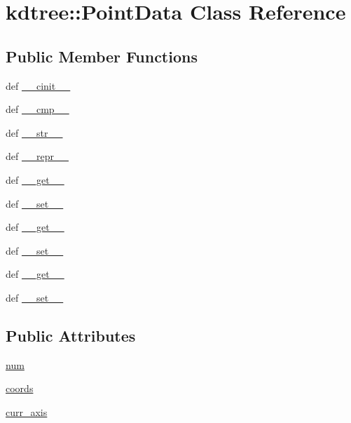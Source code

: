 \hypertarget{classkdtree_1_1PointData}{
\section{kdtree::PointData Class Reference}
\label{classkdtree_1_1PointData}
}
\subsection*{Public Member Functions}
\begin{DoxyCompactItemize}
\item 
def \hyperlink{classkdtree_1_1PointData_a81cadc16da39464cc07f2e8f2e0eb11e}{\_\-\_\-cinit\_\-\_\-}
\item 
def \hyperlink{classkdtree_1_1PointData_a430d24eb45b811759229bd33d0a705e7}{\_\-\_\-cmp\_\-\_\-}
\item 
def \hyperlink{classkdtree_1_1PointData_a1bd852059365e1d18d17d9f81dc6a9b8}{\_\-\_\-str\_\-\_\-}
\item 
def \hyperlink{classkdtree_1_1PointData_a64772819f9e0b27fc161e9072fd58806}{\_\-\_\-repr\_\-\_\-}
\item 
def \hyperlink{classkdtree_1_1PointData_a5000beba86f5112731c5cf9e7243541e}{\_\-\_\-get\_\-\_\-}
\item 
def \hyperlink{classkdtree_1_1PointData_a1f8080905a01c797e4a87153356b8ea6}{\_\-\_\-set\_\-\_\-}
\item 
def \hyperlink{classkdtree_1_1PointData_a5000beba86f5112731c5cf9e7243541e}{\_\-\_\-get\_\-\_\-}
\item 
def \hyperlink{classkdtree_1_1PointData_a1f8080905a01c797e4a87153356b8ea6}{\_\-\_\-set\_\-\_\-}
\item 
def \hyperlink{classkdtree_1_1PointData_a5000beba86f5112731c5cf9e7243541e}{\_\-\_\-get\_\-\_\-}
\item 
def \hyperlink{classkdtree_1_1PointData_a1f8080905a01c797e4a87153356b8ea6}{\_\-\_\-set\_\-\_\-}
\end{DoxyCompactItemize}
\subsection*{Public Attributes}
\begin{DoxyCompactItemize}
\item 
\hyperlink{classkdtree_1_1PointData_aa0f93c69fdf720bec92ee8a758d49014}{num}
\item 
\hyperlink{classkdtree_1_1PointData_ad1370104f57b10805299adb907dda537}{coords}
\item 
\hyperlink{classkdtree_1_1PointData_a662947723bdfd0b087f33e1d3ca7e90e}{curr\_\-axis}
\end{DoxyCompactItemize}


